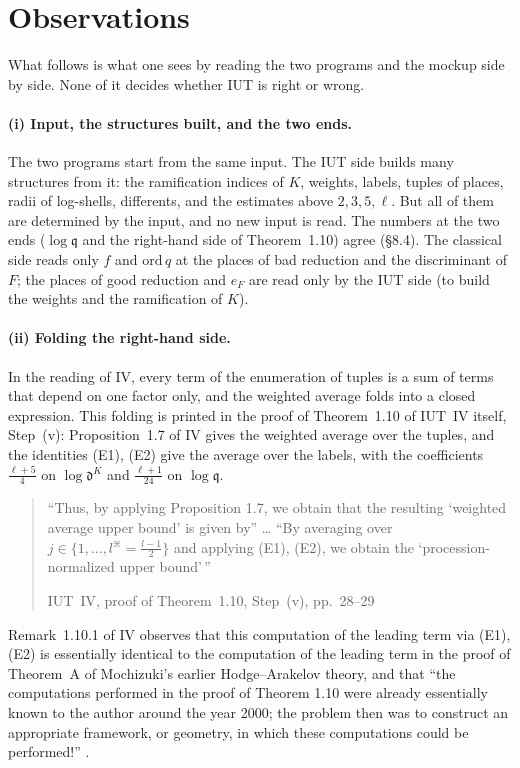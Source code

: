 \documentclass[11pt,a4paper]{article}
\newcommand{\lab}[2]{{\upshape\fcolorbox{#1}{#1!8}{\scriptsize\sffamily\bfseries\textcolor{#1}{#2}}}}
\newcommand{\tagS}{\lab{blue}{S}}
\newcommand{\tagP}{\lab{ForestGreen}{P}}
\newcommand{\q}[1]{``#1''}
\newcommand{\srcquote}[2]{\begin{quote}\small #1\par\nopagebreak\hfill{\footnotesize #2}\end{quote}}
\begin{document}
\section{Observations}
What follows is what one sees by reading the two programs and the mockup side by side. None of it decides whether IUT is
right or wrong.

\paragraph{(i) Input, the structures built, and the two ends.} \tagP{} The two programs start from the same input. The
IUT side builds many structures from it: the ramification indices of $K$, weights, labels, tuples of places, radii of
log-shells, differents, and the estimates above $2,3,5,\ell$. But all of them are determined by the input, and no new
input is read. The numbers at the two ends ($\log\mathfrak q$ and the right-hand side of Theorem~1.10) agree (\S8.4). The
classical side reads only $f$ and $\mathrm{ord}\,q$ at the places of bad reduction and the discriminant of $F$; the
places of good reduction and $e_F$ are read only by the IUT side (to build the weights and the ramification of $K$).

\paragraph{(ii) Folding the right-hand side.} \tagS{} In the reading of IV, every term of the enumeration of tuples is a
sum of terms that depend on one factor only, and the weighted average folds into a closed expression. This folding is
printed in the proof of Theorem~1.10 of IUT~IV itself, Step~(v): Proposition~1.7 of IV gives the weighted average over
the tuples, and the identities (E1), (E2) give the average over the labels, with the coefficients $\frac{\ell+5}4$ on
$\log\mathfrak d^K$ and $\frac{\ell+1}{24}$ on $\log\mathfrak q$.
\srcquote{\q{Thus, by applying Proposition 1.7, we obtain that the resulting `weighted average upper bound' is given
by} \dots{} \q{By averaging over $j\in\{1,\dots,l^{\divideontimes}=\frac{l-1}2\}$ and applying (E1), (E2), we obtain
the `procession-normalized upper bound'\,}}{IUT~IV, proof of Theorem~1.10, Step~(v), pp.~28--29 \cite{IUT4}}
Remark~1.10.1 of IV observes that this computation of the leading term via (E1), (E2) is essentially identical to the
computation of the leading term in the proof of Theorem~A of Mochizuki's earlier Hodge--Arakelov theory, and that
\q{the computations performed in the proof of Theorem 1.10 were already essentially known to the author around the year
2000; the problem then was to construct an appropriate framework, or geometry, in which these computations could be
performed!} \cite[Remark~1.10.1]{IUT4}.
\end{document}

